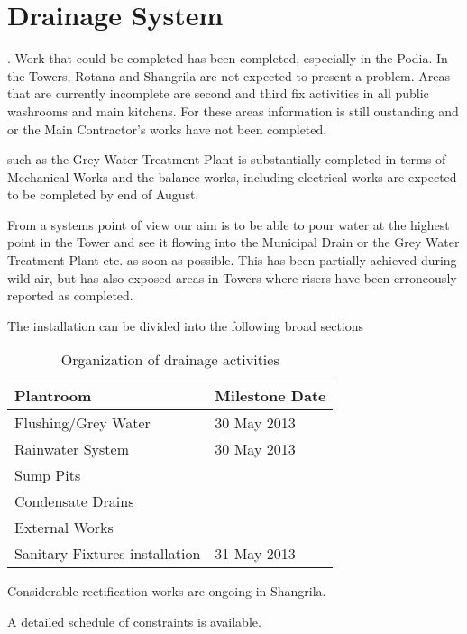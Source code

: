 \chapter{Drainage System}

. Work that could be completed has been completed, especially in the Podia. In the Towers, Rotana and Shangrila are not expected to present a problem. Areas that are currently incomplete are second and third fix activities
in all public washrooms and main kitchens. For these areas information is still oustanding and or the Main Contractor's works have not been completed. 

 such as the Grey Water Treatment Plant is substantially completed in terms of Mechanical Works and the balance works, including electrical works are expected to be completed by end of August.

From a systems point of view our aim is to be able to pour water at the highest point
in the Tower and see it flowing into the Municipal Drain or the Grey Water Treatment Plant etc.
as soon as possible. This has been partially achieved during wild air, but has also exposed areas in Towers where risers have been erroneously reported as completed.

The installation can be divided into the following broad sections

	\begin{center}
           \begin{table} 
	    \begin{tabular}{ll}
	      \toprule
	      Plantroom   &  Milestone Date  \\
	      \midrule
	      Flushing/Grey Water       &    30 May 2013  \\
	      Rainwater System      &    30 May 2013  \\
	      Sump Pits    &    \ch  \\
	     Condensate Drains &\ch\\
	     External Works &\ch \\
	     Sanitary Fixtures installation &31 May 2013 \\ 
	      \bottomrule
	    \end{tabular}
             \caption{Organization of drainage activities}
             \end{table}
          \end{center}


Considerable rectification works are ongoing in Shangrila.


A detailed schedule of constraints is available.



